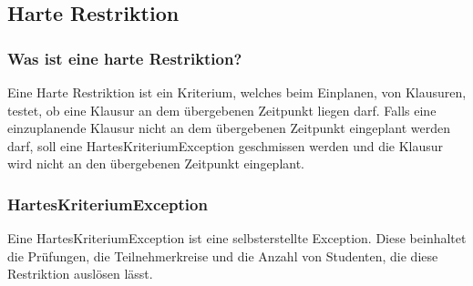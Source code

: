 \subsection{Harte Restriktion}\label{subsec:harte_restriktion}

\subsubsection{Was ist eine harte Restriktion?}
Eine Harte Restriktion ist ein Kriterium, welches beim Einplanen, von Klausuren, testet,
ob eine Klausur an dem übergebenen Zeitpunkt liegen darf.
Falls eine einzuplanende Klausur nicht an dem übergebenen Zeitpunkt eingeplant werden darf,
soll eine HartesKriteriumException geschmissen werden und die Klausur wird nicht an den übergebenen
Zeitpunkt eingeplant.

\subsubsection{HartesKriteriumException}
Eine HartesKriteriumException ist eine selbsterstellte Exception.
Diese beinhaltet die Prüfungen, die Teilnehmerkreise und die Anzahl von Studenten, die diese Restriktion auslösen lässt.


